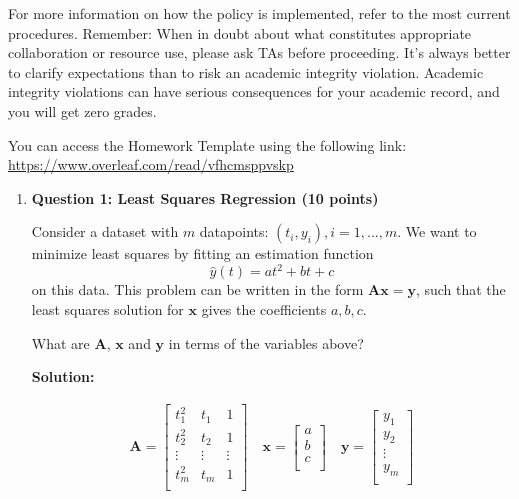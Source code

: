 \documentclass[11pt,letterpaper]{article}
\begin{document}
\begin{enumerate}
{\begin{minipage}{0.95\textwidth}
\begin{enumerate}
    For more information on how the policy is implemented, refer to the most current procedures. Remember: When in doubt about what constitutes appropriate collaboration or resource use, please ask TAs before proceeding. It's always better to clarify expectations than to risk an academic integrity violation. Academic integrity violations can have serious consequences for your academic record, and you will get zero grades.
\end{enumerate}



You can access the Homework Template using the following link: \url{https://www.overleaf.com/read/vfhcmsppvskp}
\end{minipage}}
\end{enumerate}

\clearpage
\begin{enumerate}

\item[] \textbf{Question 1: Least Squares Regression (10 points)}

Consider a dataset with $m$ datapoints: $(t_i, y_i), i=1,...,m$. We want to minimize least squares by fitting an estimation function $$\hat{y}(t)= at^2+ bt + c $$ on this data. This problem can be written in the form $\mathbf{Ax} = \mathbf{y}$, such that the least squares solution for $\mathbf{x}$ gives the coefficients $a, b, c$.

What are $\mathbf{A}$, $\mathbf{x}$ and $\mathbf{y}$ in terms of the variables above?

\textbf{Solution:}

\begin{align*}
\mathbf{A} = \begin{bmatrix}
t_1^2 & t_1 & 1 \\
t_2^2 & t_2 & 1 \\
\vdots & \vdots & \vdots \\
t_m^2 & t_m & 1 \\
\end{bmatrix}
\quad
\mathbf{x} = \begin{bmatrix}
a \\
b \\
c \\
\end{bmatrix}
\quad
\mathbf{y} = \begin{bmatrix}
y_1 \\
y_2 \\
\vdots \\
y_m \\
\end{bmatrix}
\end{align*}


\end{enumerate}
\end{document}
